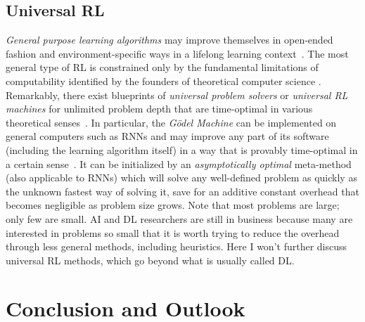 \documentclass[letterpaper]{article}
\begin{document}
\begin{CJK*}{UTF8}{gbsn}
\subsection{Universal RL}
\label{unirl}


{\em General purpose learning algorithms}
may improve themselves in open-ended fashion
and environment-specific 
ways in a lifelong learning 
context~\citep{schmidhuber87,Schmidhuber:97bias,Schmidhuber:97ssa,scholarpedia2010}. 
The most general type of RL is constrained only by the
fundamental limitations of computability identified by 
the founders of theoretical computer science 
\citep{Goedel:31,Church:36,Turing:36,Post:36}.
Remarkably, there exist blueprints of
 {\em universal problem solvers} or {\em universal RL machines}
for unlimited problem depth 
that are  
time-optimal in various theoretical senses~\citep{Hutter:05book+,Hutter:01fast+,Schmidhuber:02colt,Schmidhuber:05gmai}. 
In particular, the {\em G\"{o}del Machine} can be implemented 
on general computers such as RNNs and may improve 
any part of its software (including the learning algorithm itself)  
in a way that is provably time-optimal in a certain sense~\citep{Schmidhuber:05gmai}. It can be initialized by an 
{\em asymptotically optimal}
meta-method~\citep{Hutter:01fast+} (also applicable to RNNs)
which will solve any well-defined problem as quickly as the unknown fastest way of solving it, save for an additive constant overhead that becomes negligible as problem size grows. Note that most problems are large; only few are small. AI and DL researchers are still in business because many are interested in problems so small that it is worth trying to reduce the overhead through less general methods, including heuristics. Here I won't further discuss universal RL methods, which go beyond what is usually called DL. 

\section{Conclusion and Outlook}
\label{outlook}


\end{CJK*}
\end{document}
